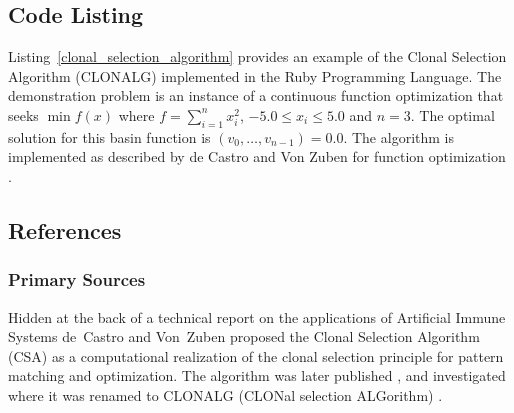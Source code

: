 \subsection{Code Listing}
Listing~\ref{clonal_selection_algorithm} provides an example of the Clonal Selection Algorithm (CLONALG) implemented in the Ruby Programming Language.
The demonstration problem is an instance of a continuous function optimization that seeks $\min f(x)$ where $f=\sum_{i=1}^n x_{i}^2$, $-5.0\leq x_i \leq 5.0$ and $n=3$. The optimal solution for this basin function is $(v_0,\ldots,v_{n-1})=0.0$.
The algorithm is implemented as described by de Castro and Von Zuben for function optimization \cite{Castro2002a}.




\subsection{References}

% 
% 
\subsubsection{Primary Sources}
Hidden at the back of a technical report on the applications of Artificial Immune Systems de~Castro and Von~Zuben \cite{Castro1999} proposed the Clonal Selection Algorithm (CSA) as a computational realization of the clonal selection principle for pattern matching and optimization.
The algorithm was later published \cite{Castro2000}, and investigated where it was renamed to CLONALG (CLONal selection ALGorithm) \cite{Castro2002a}.

